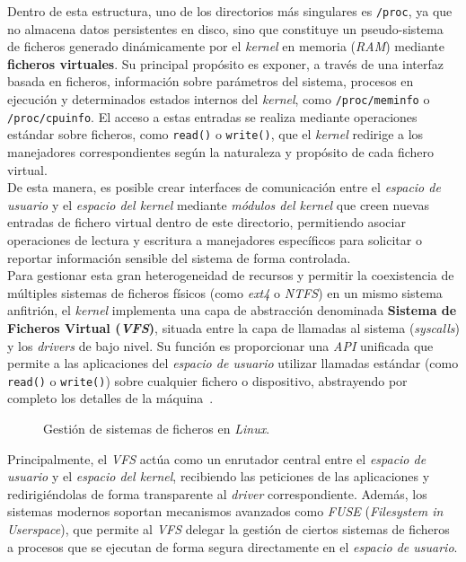 Dentro de esta estructura, uno de los directorios más singulares es \texttt{/proc}, ya que no almacena datos persistentes en disco, sino que constituye un pseudo-sistema de ficheros generado dinámicamente por el \textit{kernel} en memoria (\textit{RAM}) mediante \textbf{ficheros virtuales}.
Su principal propósito es exponer, a través de una interfaz basada en ficheros, información sobre parámetros del sistema, procesos en ejecución y determinados estados internos del \textit{kernel}, como \texttt{/proc/meminfo} o \texttt{/proc/cpuinfo}.
El acceso a estas entradas se realiza mediante operaciones estándar sobre ficheros, como \texttt{read()} o \texttt{write()}, que el \textit{kernel} redirige a los manejadores correspondientes según la naturaleza y propósito de cada fichero virtual.\\

De esta manera, es posible crear interfaces de comunicación entre el \textit{espacio de usuario} y el \textit{espacio del kernel} mediante \textit{módulos del kernel} que creen nuevas entradas de fichero virtual dentro de este directorio,
permitiendo asociar operaciones de lectura y escritura a manejadores específicos para solicitar o reportar información sensible del sistema de forma controlada.\\

Para gestionar esta gran heterogeneidad de recursos y permitir la coexistencia de múltiples sistemas de ficheros físicos (como \textit{ext4} o \textit{NTFS}) en un mismo sistema anfitrión, el \textit{kernel} implementa una capa de abstracción denominada \textbf{Sistema de Ficheros Virtual (\textit{VFS})},
situada entre la capa de llamadas al sistema (\textit{syscalls}) y los \textit{drivers} de bajo nivel.
Su función es proporcionar una \textit{API} unificada que permite a las aplicaciones del \textit{espacio de usuario} utilizar llamadas estándar (como \texttt{read()} o \texttt{write()}) sobre cualquier fichero o dispositivo, abstrayendo por completo los detalles de la máquina~\cite{librossoo}.\\

\begin{figure}[h!]
  \centering
  \scalebox{0.8}{}
  \caption{Gestión de sistemas de ficheros en \textit{Linux}.}
  \label{fig:vfs}
\end{figure}

Principalmente, el \textit{VFS} actúa como un enrutador central entre el \textit{espacio de usuario} y el \textit{espacio del kernel}, recibiendo las peticiones de las aplicaciones y redirigiéndolas de forma transparente al \textit{driver} correspondiente.
Además, los sistemas modernos soportan mecanismos avanzados como \textit{FUSE} (\textit{Filesystem in Userspace}), que permite al \textit{VFS} delegar la gestión de ciertos sistemas de ficheros a procesos que se ejecutan de forma segura directamente en el \textit{espacio de usuario}.\\

